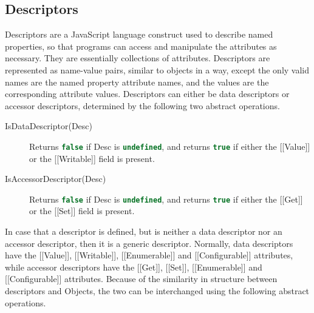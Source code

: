 \documentclass[a4paper,11pt,twoside]{report}
\def\jsinline{\lstinline[language=JavaScript, basicstyle=\small]}%\end{lstlisting}
\begin{document}
\subsection{Descriptors}\label{sec:descriptors}
Descriptors are a JavaScript language construct used to describe named properties, so that programs can access and manipulate the attributes as necessary. They are essentially collections of attributes. Descriptors are represented as name-value pairs, similar to objects in a way, except the only valid names are the named property attribute names, and the values are the corresponding attribute values. Descriptors can either be data descriptors or accessor descriptors, determined by the following two abstract operations.

\begin{description}
\item[IsDataDescriptor(Desc)] Returns \jsinline|false| if Desc is \jsinline|undefined|, and returns \jsinline|true| if either the [[Value]] or the [[Writable]] field is present.

\item[IsAccessorDescriptor(Desc)] Returns \jsinline|false| if Desc is \jsinline|undefined|, and returns \jsinline|true| if either the [[Get]] or the [[Set]] field is present.
\end{description}

In case that a descriptor is defined, but is neither a data descriptor nor an accessor descriptor, then it is a generic descriptor. Normally, data descriptors have the [[Value]], [[Writable]], [[Enumerable]] and [[Configurable]] attributes, while accessor descriptors have the [[Get]], [[Set]], [[Enumerable]] and [[Configurable]] attributes. Because of the similarity in structure between descriptors and Objects, the two can be interchanged using the following abstract operations.
\end{document}
